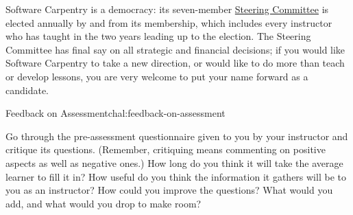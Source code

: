 Software Carpentry is a democracy: its seven-member
\href{\{\{\%20site.swc\_site\%20\}\}/scf/}{Steering Committee} is elected
annually by and from its membership, which includes every instructor who
has taught in the two years leading up to the election. The Steering
Committee has final say on all strategic and financial decisions; if you
would like Software Carpentry to take a new direction, or would like to
do more than teach or develop lessons, you are very welcome to put your
name forward as a candidate.

\begin{challenge}{Feedback on Assessment}{chal:feedback-on-assessment}

Go through the pre-assessment questionnaire given to you by your
instructor and critique its questions. (Remember, critiquing means
commenting on positive aspects as well as negative ones.) How long do
you think it will take the average learner to fill it in? How useful do
you think the information it gathers will be to you as an instructor?
How could you improve the questions? What would you add, and what would
you drop to make room?
\end{challenge}
